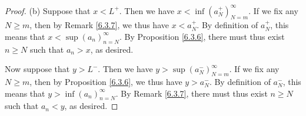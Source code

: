 \begin{proof}{(b)}
Suppose that \(x < L^+\).
Then we have \(x < \inf(a_N^+)_{N = m}^\infty\).
If we fix any \(N \geq m\), then by Remark \ref{6.3.7}, we thus have \(x < a_N^+\).
By definition of \(a_N^+\), this means that \(x < \sup(a_n)_{n = N}^\infty\).
By Proposition \ref{6.3.6}, there must thus exist \(n \geq N\) such that \(a_n > x\), as desired.

Now suppose that \(y > L^-\).
Then we have \(y > \sup(a_N^-)_{N = m}^\infty\).
If we fix any \(N \geq m\), then by Proposition \ref{6.3.6}, we thus have \(y > a_N^-\).
By definition of \(a_N^-\), this means that \(y > \inf(a_n)_{n = N}^\infty\).
By Remark \ref{6.3.7}, there must thus exist \(n \geq N\) such that \(a_n < y\), as desired.
\end{proof}

